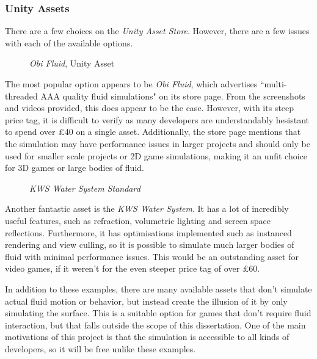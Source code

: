 \documentclass[12pt]{article}
\newcommand{\wideimage}[2][]{%
  \makebox[\textwidth][c]{\texttt{[image: \#2]}}%
}
\begin{document}
    \subsubsection{Unity Assets}

    There are a few choices on the \textit{Unity Asset Store}\cite{unityasset}. However, there are a few issues with each of the available options.

    \begin{figure}[H]
        \wideimage[]{obiFluid.png}
        \caption{\textit{Obi Fluid}, Unity Asset \cite{obi}}
    \end{figure}

    The most popular option appears to be \textit{Obi Fluid}, which advertises ``multi-threaded AAA quality fluid simulations" on its store page. From the screenshots and videos provided, this does appear to be the case. However, with its steep price tag, it is difficult to verify as many developers are understandably hesistant to spend over £40 on a single asset. Additionally, the store page mentions that the simulation may have performance issues in larger projects and should only be used for smaller scale projects or 2D game simulations, making it an unfit choice for 3D games or large bodies of fluid.

    \begin{figure}[H]
        \wideimage[]{KWS.png}
        \caption{\textit{KWS Water System Standard} \cite{kws}}
    \end{figure}

    Another fantastic asset is the \textit{KWS Water System}. It has a lot of incredibly useful features, such as refraction, volumetric lighting and screen space reflections. Furthermore, it has optimisations implemented such as instanced rendering and view culling, so it is possible to simulate much larger bodies of fluid with minimal performance issues. This would be an outstanding asset for video games, if it weren't for the even steeper price tag of over £60.

    In addition to these examples, there are many available assets that don't simulate actual fluid motion or behavior, but instead create the illusion of it by only simulating the surface. This is a suitable option for games that don't require fluid interaction, but that falls outside the scope of this dissertation. One of the main motivations of this project is that the simulation is accessible to all kinds of developers, so it will be free unlike these examples.
    
\end{document}
